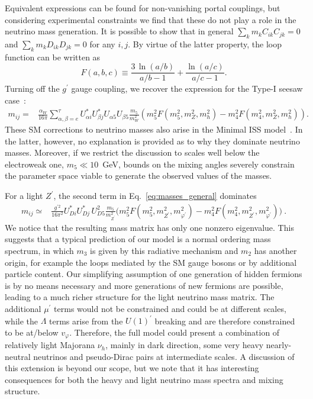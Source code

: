 Equivalent expressions can be found for non-vanishing portal couplings, but considering experimental constraints we find that these do not play a role in the neutrino mass generation. It is possible to show that in general $\sum_{k} m_k C_{ik} C_{jk} =0$ and $\sum_{k} m_k D_{ik} D_{jk} =0$ for any $i,j$. By virtue of the latter property, the loop function can be written as
%
\begin{equation} \label{eq:loop_function}
F(a,b,c) \equiv \frac{3 \, \ln{(a/b)}}{a/b - 1}  + \frac{\ln{(a/c)}}{a/c - 1}.
\end{equation}
%
Turning off the $g^\prime$ gauge coupling, we recover the expression for the Type-I seesaw case~\cite{Pilaftsis:1991ug}:
 \begin{align}  \label{eq:SM_masses}
 m_{ij} = &\frac{\alpha_W}{16\pi}\sum_{\alpha, \beta = e}^{\tau} U_{\alpha i}^\ast U_{\beta j}^\ast  U_{\alpha 5} U_{\beta 5} \frac{m_5}{m_W^2}  \left( m_5^2 F(m_5^2,m_Z^2,m_h^2) -  m_4^2 F(m_4^2,m_Z^2,m_h^2)\right).
 \end{align}
%
These SM corrections to neutrino masses also arise in the Minimal ISS model~\cite{Dev:2012sg,LopezPavon:2012zg}. In the latter, however, no explanation is provided as to why they dominate neutrino masses. Moreover, if we restrict the discussion to scales well below the electroweak one, $ m_5 \ll 10$~GeV, bounds on the mixing angles severely constrain the parameter space viable to generate the observed values of the masses. 

For a light $Z^\prime$, the second term in Eq.~\ref{eq:masses_general} dominates
%
\begin{align}\label{eq:BSM_masses}
m_{ij} \simeq  &\frac{g^{\prime2}}{16\pi^2} U_{D i}^{*} U_{D j}^{*} \,  U_{D5}^2 \frac{m_5}{m_{Z^\prime}^2} \big(m_5^2 F(m_5^2,m_{Z^\prime}^2,m_{\varphi^\prime}^2) - m_4^2 F(m_4^2,m_{Z^\prime}^2,m_{\varphi^\prime}^2)\big)~.
\end{align}
%
We notice that the resulting mass matrix has only one nonzero eigenvalue. This suggests that a typical prediction of our model is a normal ordering mass spectrum, in which $m_3$ is given by this radiative mechanism and $m_2$ has another origin, for example the loops mediated by the SM gauge bosons or by additional particle content. Our simplifying assumption of one generation of hidden fermions is by no means necessary and more generations of new fermions are possible, leading to a much richer structure for the light neutrino mass matrix. The additional $\mu^\prime$ terms would not be constrained and could be at different scales, while the $\Lambda$ terms arise from the $U(1)^\prime$ breaking and are therefore constrained to be at/below $v_\varphi$. Therefore, the full model could present a combination of relatively light Majorana $\nu_h$, mainly in dark direction, some very heavy nearly-neutral neutrinos and pseudo-Dirac pairs at intermediate scales. A discussion of this extension is beyond our scope, but we note that it has interesting consequences for both the heavy and light neutrino mass spectra and mixing structure.

